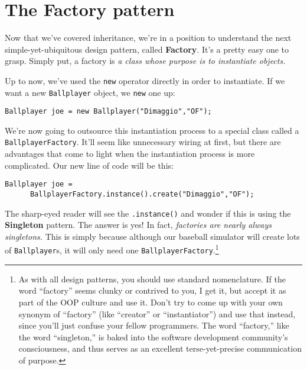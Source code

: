 
\chapter{The Factory pattern}

Now that we've covered inheritance, we're in a position to understand the next
simple-yet-ubiquitous design pattern, called \textbf{Factory}. It's a pretty
easy one to grasp. Simply put, a factory is \textit{a class whose purpose is
to instantiate objects.}

Up to now, we've used the \texttt{new} operator directly in order to
instantiate. If we want a new \texttt{Ballplayer} object, we \texttt{new} one
up:

\vspace{-.1in}
\begin{Verbatim}[fontsize=\small,samepage=true,frame=none]
  Ballplayer joe = new Ballplayer("Dimaggio","OF");
\end{Verbatim}
\vspace{-.1in}

We're now going to outsource this instantiation process to a special class
called a \texttt{BallplayerFactory}. It'll seem like unnecessary wiring at
first, but there are advantages that come to light when the instantiation
process is more complicated. Our new line of code will be this:

\vspace{-.1in}
\begin{Verbatim}[fontsize=\small,samepage=true,frame=none]
  Ballplayer joe =
      BallplayerFactory.instance().create("Dimaggio","OF");
\end{Verbatim}
\vspace{-.1in}

The sharp-eyed reader will see the \texttt{.instance()} and wonder if this is
using the \textbf{Singleton} pattern. The answer is yes! In fact,
\textit{factories are nearly always singletons.} This is simply because
although our baseball simulator will create lots of \texttt{Ballplayer}s, it
will only need one \texttt{BallplayerFactory}.\footnote{As with all design
patterns, you should use standard nomenclature. If the word ``factory'' seems
clunky or contrived to you, I get it, but accept it as part of the OOP culture
and use it. Don't try to come up with your own synonym of ``factory'' (like
``creator'' or ``instantiator'') and use that instead, since you'll just confuse
your fellow programmers. The word ``factory,'' like the word ``singleton,'' is
baked into the software development community's consciousness, and thus serves
as an excellent terse-yet-precise communication of purpose.}

